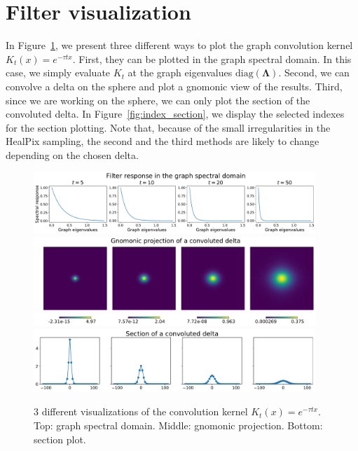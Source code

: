 \documentclass[final,twocolumn,3p,times,authoryear]{elsarticle}
\renewcommand{\b}[1]{{\bm{#1}}}   %
\newcommand{\1}{\b{1}}              %
\newcommand{\0}{\b{0}}              %
\newcommand{\bLambda}{\b{\Lambda}}
\begin{document}
\section{Filter visualization}
\label{app:filter_visualization}

In Figure~\ref{fig:gaussian_filters_visualization}, we present three different
ways to plot the graph convolution kernel $K_t(x)=e^{-\tau t x}$.  First, they can
be plotted in the graph spectral domain. In this case, we simply evaluate $K_t$
at the graph eigenvalues $\text{diag}(\bLambda)$. Second, we can convolve a
delta on the sphere and plot a gnomonic view of the results. Third, since we are
working on the sphere, we can only plot the section of the convoluted delta. In
Figure~\ref{fig:index_section}, we display the selected indexes for the section
plotting. Note that, because of the small irregularities in the HealPix
sampling, the second and the third methods are likely to change depending on the
chosen delta.

\begin{figure}[!ht]
\centering
\includegraphics[width=0.95\textwidth]{figures/gaussian_filters_spectral.pdf}
\includegraphics[width=0.95\textwidth]{figures/gaussian_filters_gnomonic.pdf}
\includegraphics[width=0.95\textwidth]{figures/gaussian_filters_section.pdf}
\caption{3 different visualizations of the convolution kernel $K_t(x)=e^{-\tau t x}$.  
Top: graph spectral domain. 
Middle: gnomonic projection.
Bottom: section plot.}
\label{fig:gaussian_filters_visualization}
\end{figure}
\end{document}
